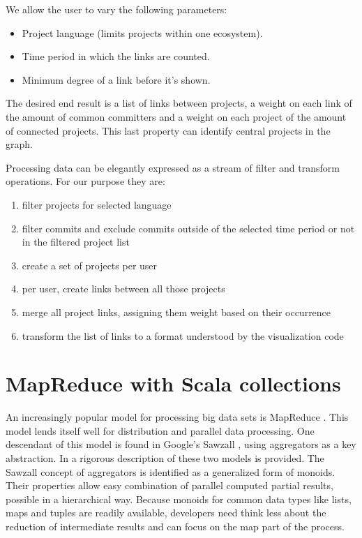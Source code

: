 \documentclass[10pt,a4paper]{article}
\begin{document}
We allow the user to vary the following parameters:
\begin{itemize}
    \item Project language (limits projects within one ecosystem).
    \item Time period in which the links are counted.
    \item Minimum degree of a link before it's shown.
\end{itemize}
The desired end result is a list of links between projects, a weight on each link of the amount of common committers and a weight on each project of the amount of connected projects. This last property can identify central projects in the graph.

Processing data can be elegantly expressed as a stream of filter and transform operations. For our purpose they are:
\begin{enumerate}
    \item filter projects for selected language
    \item filter commits and exclude commits outside of the selected time period or not in the filtered project list
    \item create a set of projects per user
    \item per user, create links between all those projects
    \item merge all project links, assigning them weight based on their occurrence
    \item transform the list of links to a format understood by the visualization code
\end{enumerate}

\section{MapReduce with Scala collections}\label{sec:mapreduce}

An increasingly popular model for processing big data sets is MapReduce \citep{dean2008mapreduce}. This model lends itself well for distribution and parallel data processing. One descendant of this model is found in Google's Sawzall \citep{pike2005interpreting}, using aggregators as a key abstraction. In \cite{lammel2008google} a rigorous description of these two models is provided. The Sawzall concept of aggregators is identified as a generalized form of monoids. Their properties allow easy combination of parallel computed partial results, possible in a hierarchical way. Because monoids for common data types like lists, maps and tuples are readily available, developers need think less about the reduction of intermediate results and can focus on the map part of the process.
\end{document}
